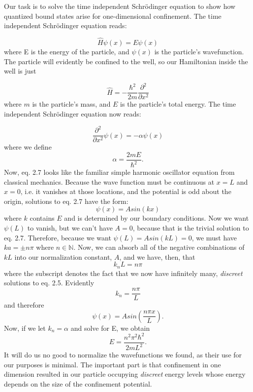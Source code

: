 Our task is to solve the time independent Schr\"{o}dinger equation to show how quantized bound states arise for one-dimensional confinement. The time independent Schr\"{o}dinger equation reads:

\begin{equation}
\hat{H} \psi(x) = E\psi(x)
\end{equation}
where E is the energy of the particle, and $\psi(x)$ is the particle's wavefunction. The particle will evidently be confined to the well, so our Hamiltonian inside the well is just

\begin{equation}
\hat{H} = - \frac{\hbar^2}{2m} \frac{\partial^2}{\partial x^2}
\label{hamil}
\end{equation}
where $m$ is the particle's mass, and $E$ is the particle's  total energy. The time independent Schr\"{o}dinger equation now reads:

\begin{equation} \label{tise}
\frac{\partial^2}{\partial x^2} \psi(x) = - \alpha \psi(x)
\end{equation}
where we define 
\begin{equation}
\alpha = \frac{2mE}{\hbar^2}.
\end{equation}
Now, eq. 2.7 looks like the familiar simple harmonic oscillator equation from classical mechanics. Because the wave function must be continuous at $x = L$ and $ x = 0$, i.e. it vanishes at those locations, and the potential is odd about the origin,  solutions to eq. 2.7 have the form:
\begin{equation} \label{soln1}
\psi(x) = A sin(k x) 
\end{equation}
where $k$ contains $E$ and is determined by our boundary conditions. Now we want $\psi(L)$ to vanish, but we can't have $A =0$, because that is the trivial solution to eq. 2.7. Therefore, because we want $\psi(L) = Asin(k L) = 0 $, we must have $ka = \pm n \pi$ where $n \in \mathbb{N}$. Now, we can absorb all of the negative combinations of $k L$ into our normalization constant, $A$, and we have, then, that 
\begin{equation}
k_n L = n \pi 
\end{equation}
where the subscript denotes the fact that we now have infinitely many, \textit{discreet} solutions to eq. 2.5. Evidently 
\begin{equation}
k_n = \frac{ n \pi}{L}
\end{equation}
and therefore
\begin{equation}
\psi(x) = A sin(\frac{n \pi x}{L}).
\end{equation}
Now, if we let $k_n = \alpha$ and solve for E, we obtain
\begin{equation}
E = \frac{n^2 \pi^2 \hbar^2}{2 m L^2}.
\end{equation}
It will do us no good to normalize the wavefunctions we found, as their use for our purposes is minimal. The important part is that confinement in one dimension resulted in our particle occupying \textit{discreet} energy levels whose energy depends on the size of the confinement potential. 

